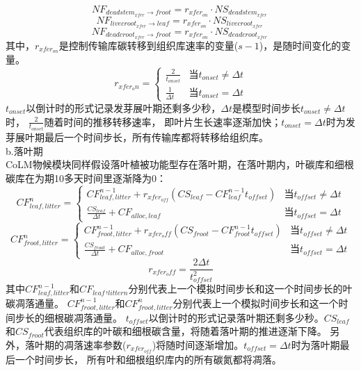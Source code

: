 \begin{equation}
  NF_{deadstem_{xfer}\rightarrow froot}=r_{{xfer}_{on}}\cdot NS_{deadstem_{xfer}}\ 
\end{equation}
\begin{equation}
  NF_{livecroot_{xfer}\rightarrow leaf}=r_{{xfer}_{on}}\cdot NS_{livecroot_{xfer}}\ 
\end{equation}
\begin{equation}
  NF_{deadcroot_{xfer}\rightarrow froot}=r_{{xfer}_{on}}\cdot NS_{deadcroot_{xfer}}\ 
\end{equation}
其中，$r_{{xfer}_{on}}$是控制传输库碳转移到组织库速率的变量($s-1$)，是随时间变化的变量。
\begin{equation}
r_{xfer_{o} n}=\left\{\begin{array}{ll}\frac{2}{t_{ {onset}}} &  { 当 } t_{ {onset}} \neq \Delta t \\ \frac{1}{\Delta t} &  { 当 } t_{onset}=\Delta t\end{array}\right.
\end{equation}
$t_{onset}$以倒计时的形式记录发芽展叶期还剩多少秒，$\Delta t$是模型时间步长$t_{onset}\neq\Delta t$时，
$\frac{2}{t_{onset}}$随着时间的推移转移速率，
即叶片生长速率逐渐加快；$t_{onset}=\Delta t$时为发芽展叶期最后一个时间步长，所有传输库都将转移给组织库。\\
b.落叶期 \\
CoLM物候模块同样假设落叶植被功能型存在落叶期，在落叶期内，叶碳库和细根碳库在为期10多天时间里逐渐降为0：
\begin{equation}
CF_{ {leaf,litter }}^{n}=\left\{\begin{array}{ll}CF_{ {leaf,litter }}^{n-1}+r_{xfer_{off}}\left(CS_{ {leaf }}-CF_{ {leaf }}^{n-1} t_{ {offset }}\right) &  { 当 } t_{ {offset }} \neq \Delta t \\ \frac{CS_{ {leaf }}}{\Delta t}+CF_{ {alloc,leaf }} &  { 当 } t_{offset}=\Delta t\end{array}\right.
\end{equation}
\begin{equation}
CF_{ {froot },  { litter }}^{n}=\left\{\begin{array}{ll}CF_{ {froot }, l i t t e r}^{n-1}+r_{xfer_{o} f f}\left(CS_{ {froot }}-CF_{ {froot }}^{n-1} t_{offset}\right) &  { 当 } t_{offset} \neq \Delta t \\ \frac{CS_{ {froot }}}{\Delta t}+CF_{ {alloc,froot }} &  { 当 } t_{offset}=\Delta t\end{array}\right.
\end{equation}
\begin{equation}
r_{xfer_{o} f f}=\frac{2 \Delta t}{t_{offset}^{2}}
\end{equation}
其中$CF_{leaf,litter}^{n-1}$和$CF_{leaf}$,$_{littern}$分别代表上一个模拟时间步长和这一个时间步长的叶碳凋落通量。
$CF_{froot,litter}^{n-1}$和$CF_{froot,litter}^n$分别代表上一个模拟时间步长和这一个时间步长的细根碳凋落通量。
$t_{offset}$以倒计时的形式记录落叶期还剩多少秒。$CS_{leaf}$和$CS_{froot}$代表组织库的叶碳和细根碳含量，将随着落叶期的推进逐渐下降。
另外，落叶期的凋落速率参数($r_{{xfer}_{off}}$)将随时间逐渐增加。$t_{offset}=\Delta t$时为落叶期最后一个时间步长，
所有叶和细根组织库内的所有碳氮都将凋落。


